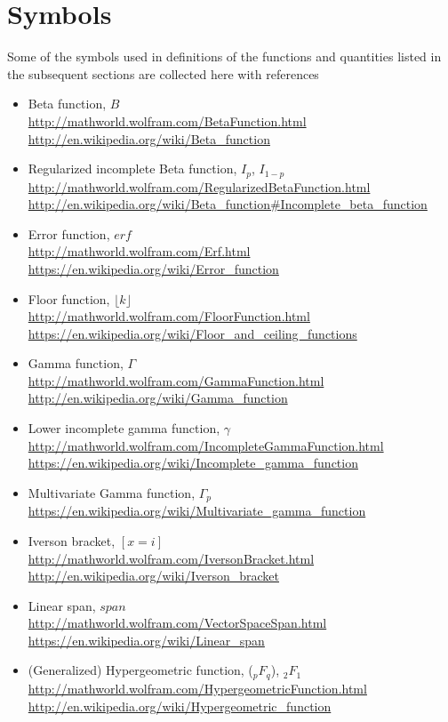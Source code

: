 \section{Symbols}
Some of the symbols used in definitions of the functions and quantities 
listed in the subsequent sections are collected here with references
\begin{itemize}
\item Beta function, $B$\\
\url{http://mathworld.wolfram.com/BetaFunction.html}\\
\url{http://en.wikipedia.org/wiki/Beta_function}
\item Regularized incomplete Beta function,  $I_p$, $I_{1-p}$\\
\url{http://mathworld.wolfram.com/RegularizedBetaFunction.html}\\
\url{http://en.wikipedia.org/wiki/Beta_function#Incomplete_beta_function}
\item Error function, $erf$\\
\url{http://mathworld.wolfram.com/Erf.html}\\
\url{https://en.wikipedia.org/wiki/Error_function}
\item Floor function, $\lfloor k \rfloor$\\
\url{http://mathworld.wolfram.com/FloorFunction.html}\\
\url{https://en.wikipedia.org/wiki/Floor_and_ceiling_functions}
\item Gamma function, $\Gamma$ \\
\url{http://mathworld.wolfram.com/GammaFunction.html}\\
\url{http://en.wikipedia.org/wiki/Gamma_function}
\item Lower incomplete gamma function, $\gamma$\\
\url{http://mathworld.wolfram.com/IncompleteGammaFunction.html}\\
\url{https://en.wikipedia.org/wiki/Incomplete_gamma_function}
\item Multivariate Gamma function,	$\Gamma_p$\\
\url{https://en.wikipedia.org/wiki/Multivariate_gamma_function}
\item Iverson bracket, $[x=i]$\\ 
\url{http://mathworld.wolfram.com/IversonBracket.html}\\
\url{http://en.wikipedia.org/wiki/Iverson_bracket}
\item Linear span, $span$\\
\url{http://mathworld.wolfram.com/VectorSpaceSpan.html}\\
\url{https://en.wikipedia.org/wiki/Linear_span}
\item (Generalized) Hypergeometric function, ($_pF_q$), $_2F_1$\\
\url{http://mathworld.wolfram.com/HypergeometricFunction.html}\\
\url{http://en.wikipedia.org/wiki/Hypergeometric_function}
\end{itemize}


